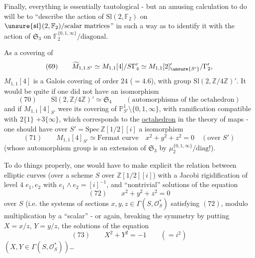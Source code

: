 
Finally, everything is essentially tautological - but an amusing calculation to
do will be to ``describe the action of $\mathrm{Sl}(2,\mathbb F_2)$ on
$\unsure{\mathfrak{sl}}(2,\mathbb F_2)/\text{scalar matrices}$''
in such a way as to identify it with the action of $\mathfrak S_3$ on
$\mathbb F_2^{\{0,1,\infty\}}/\text{diagonal}$.

As a covering of 
\[
(69)\qquad
\widetilde M_{1,1\,S'}
\simeq M_{1,1}[4]/S\Gamma'_4
\simeq M_{1,1}[2]'_{\unsure{S'}}/\Gamma'_2,
\]
$M_{1,1}[4]$ is a Galois covering of order $24$ ($=4.6$),
with group $\mathrm{Sl}(2,\mathbb Z/4\mathbb Z)'$.
 It would be quite  if one did not have an isomorphism
\[
(70)\qquad
\mathrm{Sl}(2,\mathbb Z/4\mathbb Z)'
\simeq\mathfrak S_4
\qquad
(\text{automorphisms of the octahedron})
\]
and if $M_{1,1}[4]_{S'}$ were its covering 
of $\mathbb P^1_{S'}\setminus\{0,1,\infty\}$, with
ramification compatible with
$2\{1\}$  $+3\{\infty\}$,
which corresponds to the \uline{octahedron} \unsure{\&} in the theory of
maps - one should have over
$S'=\mathrm{Spec}\,\mathbb Z[1/2][i]$
a  isomorphism
\[
(71)\qquad
M_{1,1}[4]_{S'}\simeq
\text{Fermat curve}
\quad
x^2+y^2+z^2=0
\quad(\text{over }S')
\]
(whose automorphism group is  an extension of
$\mathfrak S_3$ by
$\mu_2^{\{0,1,\infty\}}/\mathrm{diag}$!).


To do things properly, one would have to make explicit the relation between elliptic
curves  (over a scheme $S$ over
$\mathbb Z[1/2][i]$)  with a Jacobi rigidification
of level $4$ $e_1,e_2$ with $e_1\wedge e_2=[i]^{-1}$, and
``nontrivial'' solutions of the equation
\[
(72)\qquad x^2+y^2+z^2=0
\]
over $S$ (i.e. the systems of sections
$x,y,z\in\Gamma(S,\mathcal O_S^*)$ satisfying $(72)$, modulo
multiplication by a ``scalar''
- or again, breaking the symmetry by putting
$X=x/z$, $Y=y/z$, 
the solutions of the equation
\[
(73)\qquad X^2+Y^2=-1\qquad(=i^2)
\]
$(X,Y\in\Gamma(S,\mathcal O_S^*))$\ldots

